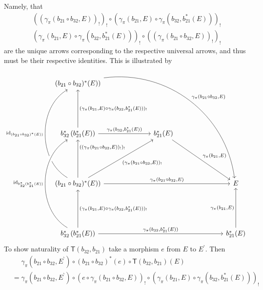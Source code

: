 \begin{enumerate}
Namely, that
\begin{align*}
  ((\gamma_{\pi}(b_{21} \circ b_{32},E))_{!})_{!}
  \circ
  \left(
    \gamma_{\pi}(b_{21},E)
    \circ
    \gamma_{\pi}(b_{32},b_{21}^{\ast}(E))
  \right)_{!}
  \\
  \left(
    \gamma_{\pi}(b_{21},E)
    \circ
    \gamma_{\pi}(b_{32},b_{21}^{\ast}(E))
  \right)_{!}
  \circ
  ((\gamma_{\pi}(b_{21} \circ b_{32},E))_{!})_{!}
\end{align*}
are the unique arrows corresponding to the respective universal arrows, and thus must be their respective identities.
This is illustrated by
\[
\begin{tikzcd}[row sep=13ex,column sep=16ex]
  (b_{21} \circ b_{32})^{\ast}(E))
  \arrow[bend left=45]{ddrr}{\gamma_{\pi}(b_{21} \circ b_{32},E)}
  &
  &
  \\
  b_{32}^{\ast}
  \left(
    b_{21}^{\ast}(E)
  \right)
  \arrow[swap]{u}{(\gamma_{\pi}(b_{21},E) \circ \gamma_{\pi}(b_{32},b_{21}^{\ast}(E)))_{!}}
  \arrow{r}{\gamma_{\pi}(b_{32},b_{21}^{\ast}(E))}
  &
  b_{21}^{\ast}(E)
  \arrow{dr}{\gamma_{\pi}(b_{21},E)}
  &
  \\
  (b_{21} \circ b_{32})^{\ast}(E))
  \arrow[swap]{u}[pos=0.8]{((\gamma_{\pi}(b_{21} \circ b_{32},E))_{!})_{!}}
  \arrow[bend left=60,crossing over]{uu}{\mathrm{id}_{(b_{21} \circ b_{32})^{\ast}(E))}}
  \arrow[swap]{ur}{(\gamma_{\pi}(b_{21} \circ b_{32},E))_{!}}
  \arrow{rr}{\gamma_{\pi}(b_{21} \circ b_{32},E)}
  &
  &
  E
  \\
  b_{32}^{\ast}
  \left(
    b_{21}^{\ast}(E)
  \right)
  \arrow[swap]{u}{(\gamma_{\pi}(b_{21},E) \circ \gamma_{\pi}(b_{32},b_{21}^{\ast}(E)))_{!}}
  \arrow[bend left=60,crossing over]{uu}{\mathrm{id}_{b_{32}^{\ast}(b_{21}^{\ast}(E))}}
  \arrow{rr}{\gamma_{\pi}(b_{32},b_{21}^{\ast}(E))}
  &
  &
  b_{21}^{\ast}(E)
  \arrow{u}{\gamma_{\pi}(b_{21},E)}
\end{tikzcd}
\]
To show naturality of $\mathsf{T}(b_{32},b_{21})$ take a morphism $e$ from $E$ to $E^{\backprime}$.
Then
\begin{align*}
  &\phantom{=}
  \gamma_{\pi}(b_{21} \circ b_{32},E^{\backprime})
  \circ
  \left(
    b_{21}
    \circ
    b_{32}
  \right)^{\ast}
  (e)
  \circ
  \mathsf{T}(b_{32},b_{21})(E)
  \\
  &=
  \gamma_{\pi}(b_{21} \circ b_{32},E^{\backprime})
  \circ
  \left(
    e
    \circ
    \gamma_{\pi}(b_{21} \circ b_{32},E)
  \right)_{!}
  \circ
  \left(
    \gamma_{\pi}(b_{21},E)
    \circ
    \gamma_{\pi}(b_{32},b_{21}^{\ast}(E))
  \right)_{!}
  \\

\end{align*}
\end{enumerate}
